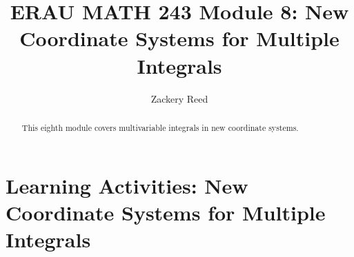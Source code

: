 \documentclass{xourse}
\title{ERAU MATH 243 Module 8: New Coordinate Systems for Multiple Integrals}
\author{Zackery Reed}
\begin{document}
\begin{abstract}
This eighth module covers multivariable integrals in new coordinate systems.
\end{abstract}
\maketitle

\part{Learning Activities: New Coordinate Systems for Multiple Integrals}
\sectionstyle



\end{document}
